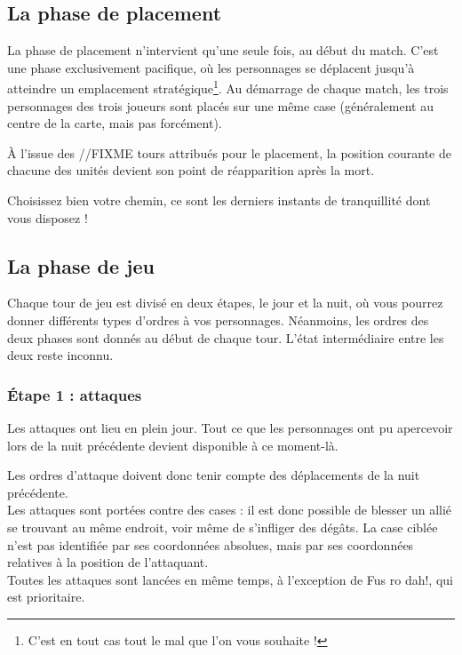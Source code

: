 \subsection{La phase de placement}
La phase de placement n'intervient qu'une seule fois, au début du
match. C'est une phase exclusivement pacifique, où les personnages se
déplacent jusqu'à atteindre un emplacement stratégique\footnote{C'est
  en tout cas tout le mal que l'on vous souhaite !}.
Au démarrage de chaque match, les trois personnages des trois joueurs
sont placés sur une même case (généralement au centre de la carte,
mais pas forcément).

À l'issue des //FIXME tours attribués pour le placement, la position
courante de chacune des unités devient son point de réapparition après
la mort.

Choisissez bien votre chemin, ce sont les derniers instants de
tranquillité dont vous disposez !

\subsection{La phase de jeu}
Chaque tour de jeu est divisé en deux étapes, le jour et la nuit, où
vous pourrez donner différents types d'ordres à vos
personnages. Néanmoins, les ordres des deux phases sont donnés au
début de chaque tour. L'état intermédiaire entre les deux reste inconnu.

\subsubsection{Étape 1 : attaques}

Les attaques ont lieu en plein jour. Tout ce que les personnages ont
pu apercevoir lors de la nuit précédente devient disponible à ce moment-là.

Les ordres d'attaque doivent donc tenir compte des déplacements de la
nuit précédente.\\

Les attaques sont portées contre des cases : il est donc possible de
blesser un allié se trouvant au même endroit, voir même de s'infliger
des dégâts. La case ciblée n'est pas identifiée par ses coordonnées
absolues, mais par ses coordonnées relatives à la position de l'attaquant.\\

Toutes les attaques sont lancées en même temps, à l'exception de Fus
ro dah!, qui est prioritaire.

